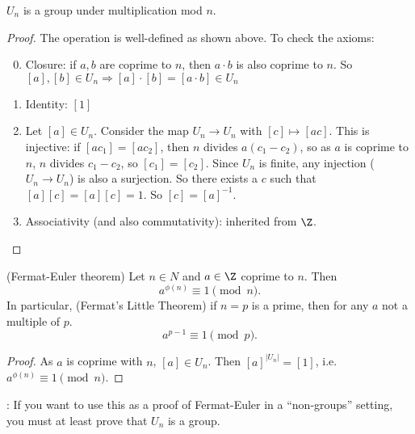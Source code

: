 \documentclass[a4pape]{article}
\begin{document}
\begin{prop}
  $U_n$ is a group under multiplication mod $n$.
\end{prop}

\begin{proof}
  The operation is well-defined as shown above. To check the axioms:
  \begin{enumerate}[label=\arabic{*}.]
  \setcounter{enumi}{-1}
  \item Closure: if $a, b$ are coprime to $n$, then $a\cdot b$ is also coprime to $n$. So $[a], [b]\in U_n \Rightarrow [a]\cdot [b] = [a\cdot b]\in U_n$
  \item Identity: $[1]$
  \item Let $[a]\in U_n$. Consider the map $U_n \to U_n$ with $[c]\mapsto [ac]$. This is injective: if $[ac_1] = [ac_2]$, then $n $ divides $a(c_1 - c_2)$, so as $a$ is coprime to $n$, $n$ divides $c_1 - c_2$, so $[c_1] = [c_2]$. Since $U_n$ is finite, any injection ($U_n \to U_n$) is also a surjection. So there exists a $c$ such that $[a][c] = [a][c] = 1$. So $[c] = [a]^{-1}$.
  \item Associativity (and also commutativity): inherited from $\Z$.
  \end{enumerate}
\end{proof}
\begin{thm}
  (Fermat-Euler theorem) Let $n\in N$ and $a\in \Z$ coprime to $n$. Then
  \[
  a^{\phi(n)} \equiv 1\pmod n.
  \]
  In particular, (Fermat's Little Theorem) if $n = p$ is a prime, then for any $a$ not a multiple of $p$.
  \[
  a^{p - 1}\equiv 1\pmod p.
  \]
\end{thm}

\begin{proof}
  As $a$ is coprime with $n$, $[a]\in U_n$. Then $[a]^{|U_n|} = [1]$, i.e. $a^{\phi(n)} \equiv 1\pmod n$.
\end{proof}
\note: If you want to use this as a proof of Fermat-Euler in a ``non-groups'' setting, you must at least prove that $U_n$ is a group.
\end{document}
